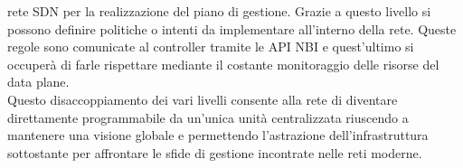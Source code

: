 rete SDN per la realizzazione del piano di gestione. Grazie a questo livello si possono
definire politiche o intenti da implementare all'interno della rete. Queste regole sono comunicate al
controller tramite le API NBI e quest'ultimo si occuperà di farle rispettare mediante il costante monitoraggio delle risorse del data plane. 
\\Questo disaccoppiamento dei vari livelli consente alla rete di diventare direttamente programmabile da un'unica unità
centralizzata riuscendo a mantenere una visione globale e permettendo l'astrazione dell'infrastruttura sottostante per affrontare le sfide 
di gestione incontrate nelle reti moderne.

